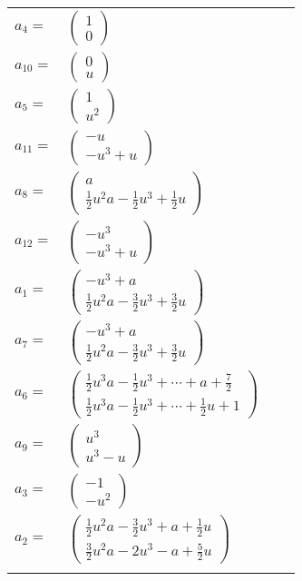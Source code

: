 \documentclass[1p]{elsarticle_modified}
\theoremstyle{definition}
\begin{document}
\begin{tabular}{m{7pt} m{180pt} m{7pt} m{180pt} }
\flushright $a_{4}=$&$\begin{pmatrix}1\\0\end{pmatrix}$ \\
\flushright $a_{10}=$&$\begin{pmatrix}0\\u\end{pmatrix}$ \\
\flushright $a_{5}=$&$\begin{pmatrix}1\\u^2\end{pmatrix}$ \\
\flushright $a_{11}=$&$\begin{pmatrix}- u\\- u^3+u\end{pmatrix}$ \\
\flushright $a_{8}=$&$\begin{pmatrix}a\\\frac{1}{2} u^2 a-\frac{1}{2} u^3+\frac{1}{2} u\end{pmatrix}$ \\
\flushright $a_{12}=$&$\begin{pmatrix}- u^3\\- u^3+u\end{pmatrix}$ \\
\flushright $a_{1}=$&$\begin{pmatrix}- u^3+a\\\frac{1}{2} u^2 a-\frac{3}{2} u^3+\frac{3}{2} u\end{pmatrix}$ \\
\flushright $a_{7}=$&$\begin{pmatrix}- u^3+a\\\frac{1}{2} u^2 a-\frac{3}{2} u^3+\frac{3}{2} u\end{pmatrix}$ \\
\flushright $a_{6}=$&$\begin{pmatrix}\frac{1}{2} u^3 a-\frac{1}{2} u^3+\cdots+a+\frac{7}{2}\\\frac{1}{2} u^3 a-\frac{1}{2} u^3+\cdots+\frac{1}{2} u+1\end{pmatrix}$ \\
\flushright $a_{9}=$&$\begin{pmatrix}u^3\\u^3- u\end{pmatrix}$ \\
\flushright $a_{3}=$&$\begin{pmatrix}-1\\- u^2\end{pmatrix}$ \\
\flushright $a_{2}=$&$\begin{pmatrix}\frac{1}{2} u^2 a-\frac{3}{2} u^3+a+\frac{1}{2} u\\\frac{3}{2} u^2 a-2 u^3- a+\frac{5}{2} u\end{pmatrix}$\\&\end{tabular}
\end{document}
